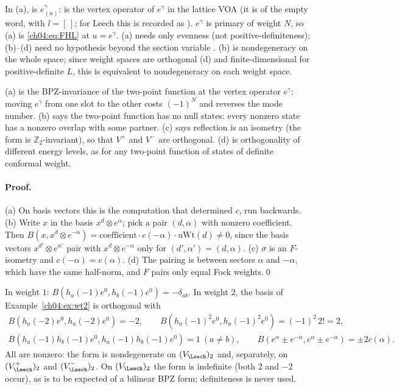 \begin{dictionary}
In (a),  is $e^\gamma_{(n)}$:  is the vertex operator of
$e^\gamma$ in the lattice VOA (it is  of the empty word,  with
$l=[\,]$; for Leech this is recorded as ). $e^\gamma$ is primary of weight
$N$, so (a) is \eqref{ch04:eq:FHL} at $u=e^\gamma$. (a) needs only evenness (not positive-definiteness);
(b)--(d) need no hypothesis beyond the section variable . (b) is nondegeneracy on the whole
space; since weight spaces are orthogonal (d) and finite-dimensional for positive-definite $L$, this
is equivalent to nondegeneracy on each weight space.
\end{dictionary}

\begin{physics}
(a) is the BPZ-invariance of the two-point function at the vertex operator $e^\gamma$: moving $e^\gamma$ from one slot to the other costs $(-1)^N$ and reverses the mode number. (b) says the two-point function has no null states: every nonzero state has a nonzero overlap with some partner. (c) says reflection is an isometry (the form is $\mathbb Z_2$-invariant), so that $V^+$ and $V^-$ are orthogonal. (d) is orthogonality of different energy levels, as for any two-point function of states of definite conformal weight.
\end{physics}

\paragraph{Proof.} (a) On basis vectors this is the computation that determined $c$, run backwards.
(b) Write $x$ in the basis $x^d\otimes e^\alpha$; pick a pair $(d,\alpha)$ with nonzero coefficient. Then
$B(x,x^d\otimes e^{-\alpha})=\text{coefficient}\cdot c(-\alpha)\cdot\mathrm{uWt}(d)\neq0$, since the basis
vectors $x^{d'}\otimes e^{\alpha'}$ pair with $x^d\otimes e^{-\alpha}$ only for $(d',\alpha')=(d,\alpha)$.
(c) $\sigma$ is an $F$-isometry and $c(-\alpha)=c(\alpha)$. (d) The pairing is between sectors $\alpha$ and
$-\alpha$, which have the same half-norm, and $F$ pairs only equal Fock weights.\qed

\begin{example}
In weight $1$: $B(h_a(-1)e^0,h_b(-1)e^0)=-\delta_{ab}$. In weight $2$, the basis of
Example~\ref{ch04:ex:wt2} is orthogonal with
\begin{gather*}
  B(h_a(-2)e^0,h_a(-2)e^0)=-2,\qquad B(h_a(-1)^2e^0,h_a(-1)^2e^0)=(-1)^2\,2!=2,\\
  B(h_a(-1)h_b(-1)e^0,h_a(-1)h_b(-1)e^0)=1\ (a\neq b),\qquad
  B(e^\alpha\pm e^{-\alpha},e^\alpha\pm e^{-\alpha})=\pm2c(\alpha).
\end{gather*}
All are nonzero: the form is nondegenerate on $(V_\Leech)_2$ and, separately, on $(V_\Leech^+)_2$ and
$(V_\Leech^-)_2$. On $(V_\Leech)_2$ the form is indefinite (both $2$ and $-2$ occur), as is to be
expected of a bilinear BPZ form; definiteness is never used.
\end{example}

